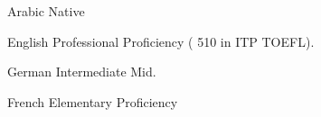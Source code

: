 
\begin{cvskills}

    \cvskill
      {Arabic} %
      {Native} %
  
    \cvskill
      {English} %
      {Professional Proficiency ( 510 in ITP TOEFL).} %
      

  \cvskill
    {German} %
    {Intermediate Mid.} %

  \cvskill
    {French} %
    {Elementary Proficiency} %
    
\end{cvskills}